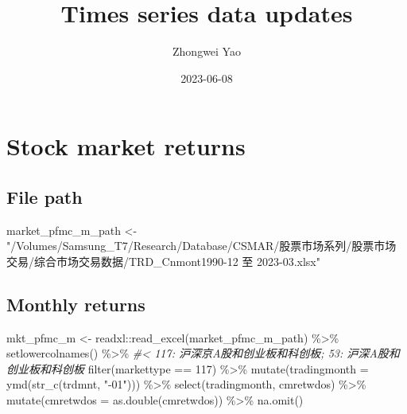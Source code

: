 \documentclass[
]{article}
\title{Times series data updates}
\author{Zhongwei Yao}
\date{2023-06-08}
\newenvironment{Shaded}{\begin{snugshade}}{\end{snugshade}}
\newcommand{\AttributeTok}[1]{\textcolor[rgb]{0.77,0.63,0.00}{#1}}
\newcommand{\CommentTok}[1]{\textcolor[rgb]{0.56,0.35,0.01}{\textit{#1}}}
\newcommand{\DecValTok}[1]{\textcolor[rgb]{0.00,0.00,0.81}{#1}}
\newcommand{\FunctionTok}[1]{\textcolor[rgb]{0.00,0.00,0.00}{#1}}
\newcommand{\NormalTok}[1]{#1}
\newcommand{\OtherTok}[1]{\textcolor[rgb]{0.56,0.35,0.01}{#1}}
\newcommand{\SpecialCharTok}[1]{\textcolor[rgb]{0.00,0.00,0.00}{#1}}
\newcommand{\StringTok}[1]{\textcolor[rgb]{0.31,0.60,0.02}{#1}}
\begin{document}
\maketitle

{
\hypersetup{linkcolor=}
\setcounter{tocdepth}{2}
\tableofcontents
}
\listoffigures
\listoftables
\hypertarget{stock-market-returns}{%
\section{Stock market returns}\label{stock-market-returns}}

\hypertarget{file-path}{%
\subsection{File path}\label{file-path}}

\begin{Shaded}
\begin{Highlighting}[]
\NormalTok{market\_pfmc\_m\_path }\OtherTok{\textless{}{-}} \StringTok{"/Volumes/Samsung\_T7/Research/Database/CSMAR/股票市场系列/股票市场交易/综合市场交易数据/TRD\_Cnmont1990{-}12 至 2023{-}03.xlsx"}
\end{Highlighting}
\end{Shaded}

\hypertarget{monthly-returns}{%
\subsection{Monthly returns}\label{monthly-returns}}

\begin{Shaded}
\begin{Highlighting}[]
\NormalTok{mkt\_pfmc\_m }\OtherTok{\textless{}{-}}\NormalTok{ readxl}\SpecialCharTok{::}\FunctionTok{read\_excel}\NormalTok{(market\_pfmc\_m\_path) }\SpecialCharTok{\%\textgreater{}\%} 
  \FunctionTok{setlowercolnames}\NormalTok{() }\SpecialCharTok{\%\textgreater{}\%} 
  \CommentTok{\#\textless{} 117: 沪深京A股和创业板和科创板; 53: 沪深A股和创业板和科创板}
  \FunctionTok{filter}\NormalTok{(markettype }\SpecialCharTok{==} \DecValTok{117}\NormalTok{) }\SpecialCharTok{\%\textgreater{}\%} 
  \FunctionTok{mutate}\NormalTok{(}\AttributeTok{tradingmonth =} \FunctionTok{ymd}\NormalTok{(}\FunctionTok{str\_c}\NormalTok{(trdmnt, }\StringTok{"{-}01"}\NormalTok{))) }\SpecialCharTok{\%\textgreater{}\%} 
  \FunctionTok{select}\NormalTok{(tradingmonth, cmretwdos) }\SpecialCharTok{\%\textgreater{}\%} 
  \FunctionTok{mutate}\NormalTok{(}\AttributeTok{cmretwdos =} \FunctionTok{as.double}\NormalTok{(cmretwdos)) }\SpecialCharTok{\%\textgreater{}\%} 
  \FunctionTok{na.omit}\NormalTok{()}
\end{Highlighting}
\end{Shaded}
\end{document}
